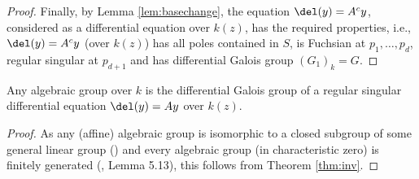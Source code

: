 \documentclass[a4paper, 11pt]{article}
\begin{document}
\begin{proof}
	Finally, by Lemma \ref{lem:basechange}, the equation $\del(y)=A^cy$, considered as a differential equation over $k(z)$, has the required properties, i.e., $\del(y)=A^cy$ (over $k(z)$) has all poles contained in $S$, is Fuchsian at $p_1,\ldots,p_d$, regular singular at $p_{d+1}$ and has differential Galois group $(G_1)_k=G$.	
%	
\end{proof}



	\begin{corollary}\label{cor:inv}
		Any algebraic group over $k$ is the differential Galois group of a regular singular differential equation $\del (y) = A y$ over $k(z)$.
	\end{corollary}
	\begin{proof}
	As any (affine) algebraic group is isomorphic to a closed subgroup of some general linear group (\cite[Cor. 4.10]{Milne:AlgebraicGroups}) and every algebraic group (in characteristic zero) is finitely generated (\cite{SVDP}, Lemma 5.13), this follows from Theorem \ref{thm:inv}.
	\end{proof}	
\end{document}
